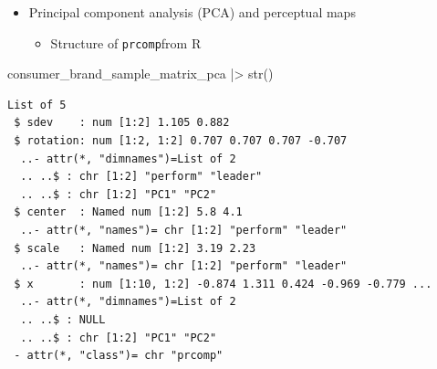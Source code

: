 \documentclass[
  ignorenonframetext,
]{beamer}
\newenvironment{Shaded}{\begin{snugshade}}{\end{snugshade}}
\newcommand{\FunctionTok}[1]{\textcolor[rgb]{0.28,0.35,0.67}{#1}}
\newcommand{\NormalTok}[1]{\textcolor[rgb]{0.00,0.23,0.31}{#1}}
\newcommand{\SpecialCharTok}[1]{\textcolor[rgb]{0.37,0.37,0.37}{#1}}
\providecommand{\tightlist}{%
  \setlength{\itemsep}{0pt}\setlength{\parskip}{0pt}}\usepackage{longtable,booktabs,array}
\begin{document}
\begin{frame}[fragile]{}
\label{section-30}
\begin{itemize}
\item
  Principal component analysis (PCA) and perceptual maps

  \begin{itemize}
  \tightlist
  \item
    Structure of \texttt{prcomp}from R
  \end{itemize}
\end{itemize}

\tiny

\begin{Shaded}
\begin{Highlighting}[]
\NormalTok{consumer\_brand\_sample\_matrix\_pca }\SpecialCharTok{|\textgreater{}} \FunctionTok{str}\NormalTok{()}
\end{Highlighting}
\end{Shaded}

\begin{verbatim}
List of 5
 $ sdev    : num [1:2] 1.105 0.882
 $ rotation: num [1:2, 1:2] 0.707 0.707 0.707 -0.707
  ..- attr(*, "dimnames")=List of 2
  .. ..$ : chr [1:2] "perform" "leader"
  .. ..$ : chr [1:2] "PC1" "PC2"
 $ center  : Named num [1:2] 5.8 4.1
  ..- attr(*, "names")= chr [1:2] "perform" "leader"
 $ scale   : Named num [1:2] 3.19 2.23
  ..- attr(*, "names")= chr [1:2] "perform" "leader"
 $ x       : num [1:10, 1:2] -0.874 1.311 0.424 -0.969 -0.779 ...
  ..- attr(*, "dimnames")=List of 2
  .. ..$ : NULL
  .. ..$ : chr [1:2] "PC1" "PC2"
 - attr(*, "class")= chr "prcomp"
\end{verbatim}
\end{frame}
\end{document}
